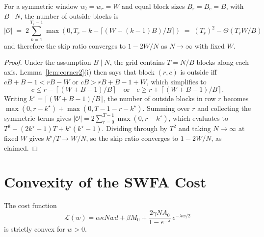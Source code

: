 \begin{lemma}\label{lem:blockcount}
For a symmetric window $w_l = w_r = W$ and equal block sizes
$B_r = B_c = B$, with $B \mid N$, the number of outside blocks is
\begin{equation}\label{eq:block_count}
    |\mathcal{O}|
    \;=\; 2 \sum_{k=1}^{T_r - 1}
          \max(0, T_r - k - \lceil (W + (k-1) B) / B \rceil)
    \;=\; (T_r)^2 - \Theta(T_r W / B)
\end{equation}
and therefore the skip ratio converges to $1 - 2W / N$ as
$N \to \infty$ with fixed $W$.
\end{lemma}

\begin{proof}
Under the assumption $B \mid N$, the grid contains $T = N/B$
blocks along each axis. Lemma~\ref{lem:corner2}(i) then says that
block $(r, c)$ is outside iff
$c B + B - 1 < r B - W$ or $c B > r B + B - 1 + W$, which
simplifies to
\begin{equation}\label{eq:blockout}
    c \le r - \left\lceil (W + B - 1)/B \right\rceil
    \quad \text{or} \quad
    c \ge r + \left\lceil (W + B - 1)/B \right\rceil.
\end{equation}
Writing $k^\star = \lceil (W + B - 1)/B \rceil$, the number of
outside blocks in row $r$ becomes
$\max(0, r - k^\star) + \max(0, T - 1 - r - k^\star)$. Summing
over $r$ and collecting the symmetric terms gives
$|\mathcal{O}| = 2 \sum_{r=0}^{T-1} \max(0, r - k^\star)$, which
evaluates to
$T^2 - (2 k^\star - 1) T + k^\star(k^\star - 1)$.
Dividing through by $T^2$ and taking $N \to \infty$ at fixed $W$
gives $k^\star / T \to W / N$, so the skip ratio converges to
$1 - 2W/N$, as claimed.
\end{proof}

\section{Convexity of the SWFA Cost}\label{app:proof_convex}

\begin{theorem}\label{thm:convex2}
The cost function
\begin{equation}
    \mathcal{L}(w) = \alpha \kappa N w d + \beta M_0
        + \frac{2 \gamma N A_0}{1 - e^{-\lambda}}\, e^{-\lambda w / 2}
\end{equation}
is strictly convex for $w > 0$.
\end{theorem}

